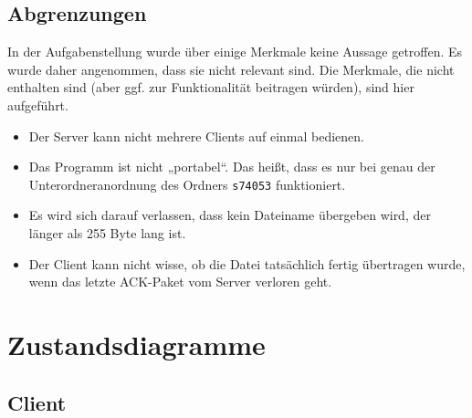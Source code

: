 \subsection{Abgrenzungen}
\label{abgrenz}
In der Aufgabenstellung wurde über einige Merkmale keine Aussage getroffen. Es wurde daher angenommen, dass sie nicht relevant sind. Die Merkmale, die nicht enthalten sind (aber ggf. zur Funktionalität beitragen würden), sind hier aufgeführt.
\begin{itemize}
\item Der Server kann nicht mehrere Clients auf einmal bedienen.
\item Das Programm ist nicht „portabel“. Das heißt, dass es nur bei genau der Unterordneranordnung des Ordners \texttt{s74053} funktioniert.
\item Es wird sich darauf verlassen, dass kein Dateiname übergeben wird, der länger als 255 Byte lang ist.
\item Der Client kann nicht wisse, ob die Datei tatsächlich fertig übertragen wurde, wenn das letzte ACK-Paket vom Server verloren geht.
\end{itemize}

\section{Zustandsdiagramme}
\label{stated}
\subsection{Client}
\begin{center}
\end{center}

